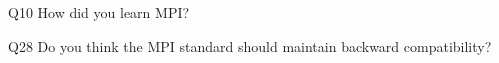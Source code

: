 \begin{description}%
\item{Q10} How did you learn MPI?%
\item{Q28} Do you think the MPI standard should maintain backward compatibility?%
\end{description}%
